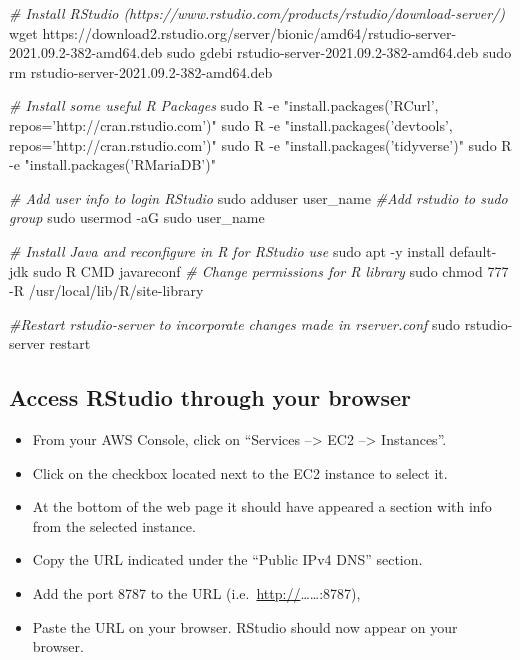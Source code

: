 \documentclass[]{book}
\newenvironment{Shaded}{\begin{snugshade}}{\end{snugshade}}
\newcommand{\StringTok}[1]{\textcolor[rgb]{0.31,0.60,0.02}{#1}}
\newcommand{\CommentTok}[1]{\textcolor[rgb]{0.56,0.35,0.01}{\textit{#1}}}
\newcommand{\FunctionTok}[1]{\textcolor[rgb]{0.00,0.00,0.00}{#1}}
\newcommand{\NormalTok}[1]{#1}
\providecommand{\tightlist}{%
  \setlength{\itemsep}{0pt}\setlength{\parskip}{0pt}}
\begin{document}
\begin{Shaded}
\begin{Highlighting}[]
\CommentTok{# Install RStudio (https://www.rstudio.com/products/rstudio/download-server/)}
\FunctionTok{wget}\NormalTok{ https://download2.rstudio.org/server/bionic/amd64/rstudio-server-2021.09.2-382-amd64.deb}
\FunctionTok{sudo}\NormalTok{ gdebi rstudio-server-2021.09.2-382-amd64.deb}
\FunctionTok{sudo}\NormalTok{ rm rstudio-server-2021.09.2-382-amd64.deb}


\CommentTok{# Install some useful R Packages }
\FunctionTok{sudo}\NormalTok{ R -e }\StringTok{"install.packages('RCurl', repos='http://cran.rstudio.com')"}
\FunctionTok{sudo}\NormalTok{ R -e }\StringTok{"install.packages('devtools', repos='http://cran.rstudio.com')"}
\FunctionTok{sudo}\NormalTok{ R -e }\StringTok{"install.packages('tidyverse')"}
\FunctionTok{sudo}\NormalTok{ R -e }\StringTok{"install.packages('RMariaDB')"}


\CommentTok{# Add user info to login RStudio}
\FunctionTok{sudo}\NormalTok{ adduser user_name}
\CommentTok{#Add rstudio to sudo group}
\FunctionTok{sudo}\NormalTok{ usermod -aG sudo user_name}


\CommentTok{# Install Java and reconfigure in R for RStudio use}
\FunctionTok{sudo}\NormalTok{ apt -y install default-jdk}
\FunctionTok{sudo}\NormalTok{ R CMD javareconf}
\CommentTok{# Change permissions for R library}
\FunctionTok{sudo}\NormalTok{ chmod 777 -R /usr/local/lib/R/site-library}


\CommentTok{#Restart rstudio-server to incorporate changes made in rserver.conf}
\FunctionTok{sudo}\NormalTok{ rstudio-server restart}
\end{Highlighting}
\end{Shaded}

\subsection{Access RStudio through your
browser}\label{access-rstudio-through-your-browser}

\begin{itemize}
\tightlist
\item
  From your AWS Console, click on ``Services --\textgreater{} EC2
  --\textgreater{} Instances''.
\item
  Click on the checkbox located next to the EC2 instance to select it.
\item
  At the bottom of the web page it should have appeared a section with
  info from the selected instance.
\item
  Copy the URL indicated under the ``Public IPv4 DNS'' section.
\item
  Add the port 8787 to the URL
  (i.e.~\url{http://}\ldots{}\ldots{}:8787),
\item
  Paste the URL on your browser. RStudio should now appear on your
  browser.
\end{itemize}
\end{document}
